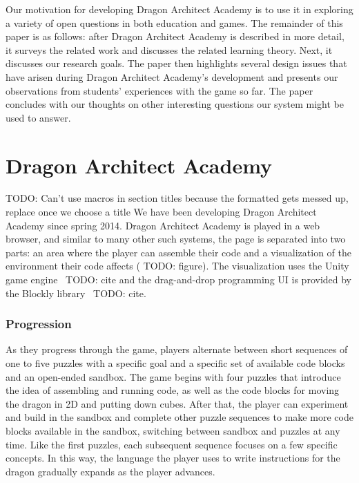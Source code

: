 \documentclass{sig-alternate}
\newcommand{\TODO}[1]{{\color{red} TODO: #1}}
\newcommand{\gametitle}{{\color{RoyalPurple} Dragon Architect Academy}}
\begin{document}
Our motivation for developing \gametitle{} is to use it in exploring a variety of open questions in both education and games. 
The remainder of this paper is as follows: after \gametitle{} is described in more detail, it surveys the related work and discusses the related learning theory. 
Next, it discusses our research goals. 
The paper then highlights several design issues that have arisen during \gametitle{}'s development and presents our observations from students' experiences with the game so far. 
The paper concludes with our thoughts on other interesting questions our system might be used to answer.

\section{\gametitle{}}
\TODO{Can't use macros in section titles because the formatted gets messed up, replace once we choose a title}
We have been developing \gametitle{} since spring 2014. 
\gametitle{} is played in a web browser, and similar to many other such systems, the page is separated into two parts: an area where the player can assemble their code and a visualization of the environment their code affects (\TODO{figure}). 
The visualization uses the Unity game engine~\TODO{cite} and the drag-and-drop programming UI is provided by the Blockly library~\TODO{cite}.

\subsubsection{Progression}

As they progress through the game, players alternate between short sequences of one to five puzzles with a specific goal and a specific set of available code blocks and an open-ended sandbox. 
The game begins with four puzzles that introduce the idea of assembling and running code, as well as the code blocks for moving the dragon in 2D and putting down cubes.
After that, the player can experiment and build in the sandbox and complete other puzzle sequences to make more code blocks available in the sandbox, switching between sandbox and puzzles at any time. 
Like the first puzzles, each subsequent sequence focuses on a few specific concepts. 
In this way, the language the player uses to write instructions for the dragon gradually expands as the player advances.

\end{document}
